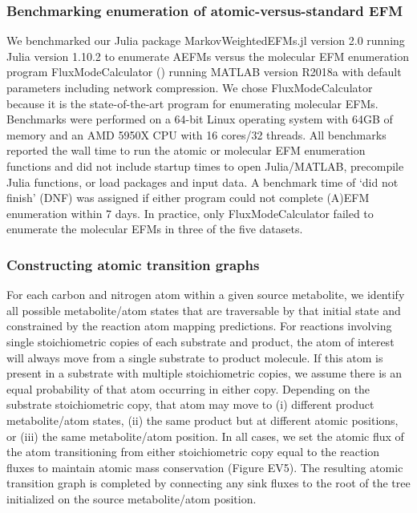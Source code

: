 \documentclass[12pt]{article}
\begin{document}
\subsubsection*{Benchmarking enumeration of atomic-versus-standard EFM}

We benchmarked our Julia package MarkovWeightedEFMs.jl version 2.0
running Julia version 1.10.2 to enumerate
AEFMs versus the molecular EFM enumeration program FluxModeCalculator
(\cite{vanKlinkenJanBert2016Faet}) running MATLAB version R2018a with
default parameters including network compression. We chose
FluxModeCalculator because it is the state-of-the-art program for
enumerating molecular EFMs. Benchmarks were performed on a 64-bit Linux
operating system with 64GB of memory and an AMD 5950X CPU with 16 cores/32
threads. All benchmarks reported the wall time to run the atomic or
molecular EFM enumeration functions and did not include startup times to
open Julia/MATLAB, precompile Julia functions, or load packages and input
data. A benchmark time of `did not finish' (DNF) was assigned if either
program could not complete (A)EFM enumeration within 7 days. In practice,
only FluxModeCalculator failed to enumerate the molecular EFMs in three of
the five datasets.

\subsubsection*{Constructing atomic transition graphs}

For each carbon and nitrogen atom within a given source metabolite, we
identify all possible metabolite/atom states that are traversable by that
initial state and constrained by the reaction atom mapping predictions.
For reactions involving single stoichiometric copies of each substrate and
product, the atom of interest will always move from a single substrate to
product molecule. If this atom is present in a substrate with multiple
stoichiometric copies, we assume there is an equal probability of that
atom occurring in either copy. Depending on the substrate stoichiometric
copy, that atom may move to (i) different product metabolite/atom states,
(ii) the same product but at different atomic positions, or (iii) the same
metabolite/atom position. In all cases, we set the atomic flux of the atom
transitioning from either stoichiometric copy equal to the reaction fluxes
to maintain atomic mass conservation (Figure EV5). The resulting atomic
transition graph is completed by connecting any sink fluxes to the root of
the tree initialized on the source metabolite/atom position. 
\end{document}
